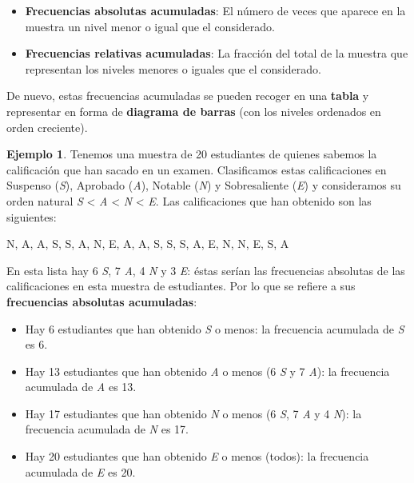 \documentclass[
]{book}
\newenvironment{Shaded}{\begin{snugshade}}{\end{snugshade}}
\newcommand{\NormalTok}[1]{#1}
\providecommand{\tightlist}{%
  \setlength{\itemsep}{0pt}\setlength{\parskip}{0pt}}
\theoremstyle{definition}
\theoremstyle{definition}
\newtheorem{example}{Ejemplo}[chapter]
\theoremstyle{definition}
\theoremstyle{definition}
\theoremstyle{remark}
\begin{document}
\begin{itemize}
\item
  \textbf{Frecuencias absolutas acumuladas}: El número de veces que aparece en la muestra un nivel menor o igual que el considerado.
\item
  \textbf{Frecuencias relativas acumuladas}: La fracción del total de la muestra que representan los niveles menores o iguales que el considerado.
\end{itemize}

De nuevo, estas frecuencias acumuladas se pueden recoger en una \textbf{tabla} y representar en forma de \textbf{diagrama de barras} (con los niveles ordenados en orden creciente).

\begin{example}
\protect\hypertarget{exm:ex1701bis}{}\label{exm:ex1701bis}Tenemos una muestra de 20 estudiantes de quienes sabemos la calificación que han sacado en un examen. Clasificamos estas calificaciones en Suspenso (\emph{S}), Aprobado (\emph{A}), Notable (\emph{N}) y Sobresaliente (\emph{E}) y consideramos su orden natural \emph{S} \textless{} \emph{A} \textless{} \emph{N} \textless{} \emph{E}. Las calificaciones que han obtenido son las siguientes:
\end{example}

\begin{Shaded}
\begin{Highlighting}[]
\NormalTok{N, A, A, S, S, A, N, E, A, A, S, S, S, A, E, N, N, E, S, A}
\end{Highlighting}
\end{Shaded}

En esta lista hay 6 \emph{S}, 7 \emph{A}, 4 \emph{N} y 3 \emph{E}: éstas serían las frecuencias absolutas de las calificaciones en esta muestra de estudiantes. Por lo que se refiere a sus \textbf{frecuencias absolutas acumuladas}:

\begin{itemize}
\tightlist
\item
  Hay 6 estudiantes que han obtenido \emph{S} o menos: la frecuencia acumulada de \emph{S} es 6.
\item
  Hay 13 estudiantes que han obtenido \emph{A} o menos (6 \emph{S} y 7 \emph{A}): la frecuencia acumulada de \emph{A} es 13.
\item
  Hay 17 estudiantes que han obtenido \emph{N} o menos (6 \emph{S}, 7 \emph{A} y 4 \emph{N}): la frecuencia acumulada de \emph{N} es 17.
\item
  Hay 20 estudiantes que han obtenido \emph{E} o menos (todos): la frecuencia acumulada de \emph{E} es 20.
\end{itemize}
\end{document}
